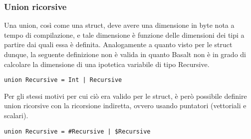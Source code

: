 

\subsubsection{Union ricorsive}
Una union, così come una struct, deve avere una dimensione in byte nota a tempo di compilazione, e tale dimensione è funzione delle dimensioni dei tipi a partire dai quali essa è definita. Analogamente a quanto visto per le struct dunque, la seguente definizione non è valida in quanto Basalt non è in grado di calcolare la dimensione di una ipotetica variabile di tipo Recursive. 

\vspace{0.5cm}
\begin{lstlisting}[frame=single]
union Recursive = Int | Recursive
\end{lstlisting}
\vspace{0.5cm}
 
Per gli stessi motivi per cui ciò era valido per le struct, è però possibile definire union ricorsive con la ricorsione indiretta, ovvero usando puntatori (vettoriali e scalari).

\vspace{0.5cm}
\begin{lstlisting}[frame=single]
union Recursive = #Recursive | $Recursive
\end{lstlisting}
\vspace{0.5cm}
